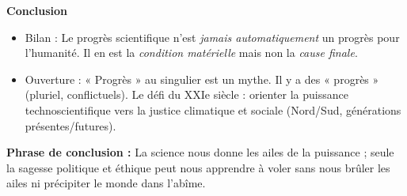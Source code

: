 \documentclass[11pt]{article}
\begin{document}
\begin{exoresolu}
    \textbf{Conclusion}
    \begin{itemize}
        \item Bilan : Le progrès scientifique n'est \emph{jamais automatiquement} un progrès pour l'humanité. Il en est la \emph{condition matérielle} mais non la \emph{cause finale}.
        \item Ouverture : « Progrès » au singulier est un mythe. Il y a des « progrès » (pluriel, conflictuels). Le défi du XXIe siècle : orienter la puissance technoscientifique vers la justice climatique et sociale (Nord/Sud, générations présentes/futures).
    \end{itemize}
    \textbf{Phrase de conclusion :} \guillemotleft La science nous donne les ailes de la puissance ; seule la sagesse politique et éthique peut nous apprendre à voler sans nous brûler les ailes ni précipiter le monde dans l'abîme. \guillemotright
\end{exoresolu}
\end{document}
